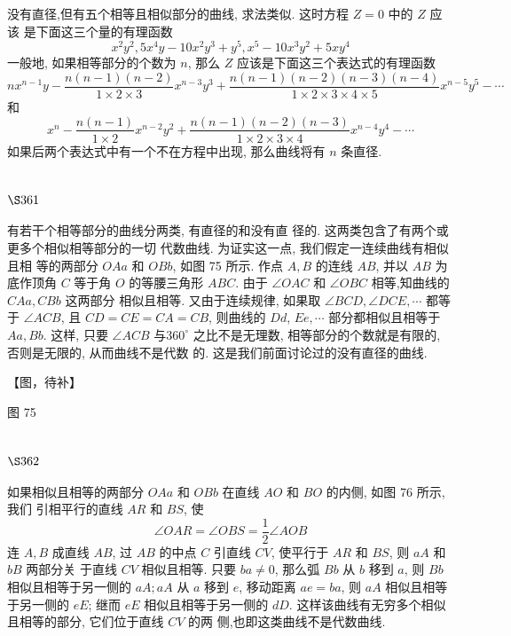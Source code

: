 没有直径,但有五个相等且相似部分的曲线, 求法类似. 这时方程 $Z=0$ 中的 $Z$ 应该 是下面这三个量的有理函数
\[
x^{2} y^{2}, 5 x^{4} y-10 x^{2} y^{3}+y^{5}, x^{5}-10 x^{3} y^{2}+5 x y^{4}
\]
一般地, 如果相等部分的个数为 $n$, 那么 $Z$ 应该是下面这三个表达式的有理函数
\[
n x^{n-1} y-\frac{n(n-1)(n-2)}{1 \times 2 \times 3} x^{n-3} y^{3}+\frac{n(n-1)(n-2)(n-3)(n-4)}{1 \times 2 \times 3 \times 4 \times 5} x^{n-5} y^{5}-\cdots
\]
和
\[
x^{n}-\frac{n(n-1)}{1 \times 2} x^{n-2} y^{2}+\frac{n(n-1)(n-2)(n-3)}{1 \times 2 \times 3 \times 4} x^{n-4} y^{4}-\cdots
\]
如果后两个表达式中有一个不在方程中出现, 那么曲线将有 $n$ 条直径.

\section{$\S 361$}

有若干个相等部分的曲线分两类, 有直径的和没有直 径的. 这两类包含了有两个或更多个相似相等部分的一切 代数曲线. 为证实这一点, 我们假定一连续曲线有相似且相 等的两部分 $O A a$ 和 $O B b$, 如图 75 所示. 作点 $A, B$ 的连线 $A B$, 并以 $A B$ 为底作顶角 $C$ 等于角 $O$ 的等腰三角形 $A B C$. 由于 $\angle O A C$ 和 $\angle O B C$ 相等,知曲线的 $C A a, C B b$ 这两部分 相似且相等. 又由于连续规律, 如果取 $\angle B C D, \angle D C E, \cdots$ 都等于 $\angle A C B$, 且 $C D=C E=C A=C B$, 则曲线的 $D d$, $E e, \cdots$ 部分都相似且相等于 $A a, B b$. 这样, 只要 $\angle A C B$ 与$360^{\circ}$ 之比不是无理数, 相等部分的个数就是有限的, 否则是无限的, 从而曲线不是代数 的. 这是我们前面讨论过的没有直径的曲线.


【图，待补】

图 75 

\section{$\S 362$}

如果相似且相等的两部分 $O A a$ 和 $O B b$ 在直线 $A O$ 和 $B O$ 的内侧, 如图 76 所示, 我们 引相平行的直线 $A R$ 和 $B S$, 使
\[
\angle O A R=\angle O B S=\frac{1}{2} \angle A O B
\]
连 $A, B$ 成直线 $A B$, 过 $A B$ 的中点 $C$ 引直线 $C V$, 使平行于 $A R$ 和 $B S$, 则 $a A$ 和 $b B$ 两部分关 于直线 $C V$ 相似且相等. 只要 $b a \neq 0$, 那么弧 $B b$ 从 $b$ 移到 $a$, 则 $B b$ 相似且相等于另一侧的 $a A ; a A$ 从 $a$ 移到 $e$, 移动距离 $a e=b a$, 则 $a A$ 相似且相等于另一侧的 $e E$; 继而 $e E$ 相似且相等于另一侧的 $d D$. 这样该曲线有无穷多个相似且相等的部分, 它们位于直线 $C V$ 的两 侧,也即这类曲线不是代数曲线.


